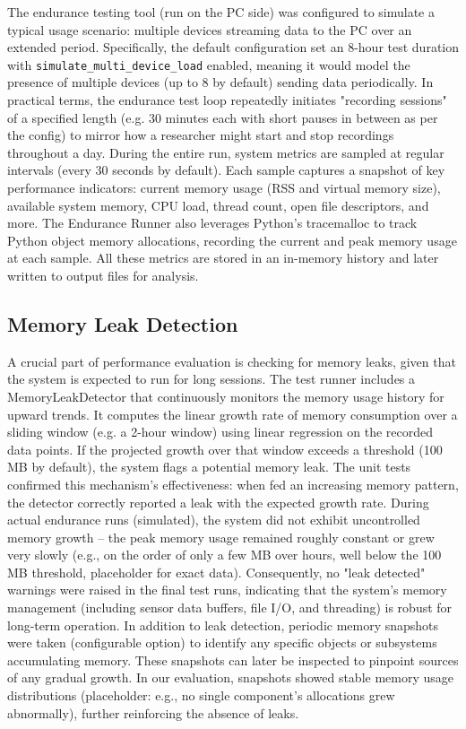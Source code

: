 \documentclass[11pt,a4paper]{report}
\begin{document}
The endurance testing tool (run on the PC side) was configured to simulate a typical usage scenario: multiple devices streaming data to the PC over an extended period. Specifically, the default configuration set an 8-hour test duration with \texttt{simulate\_multi\_device\_load} enabled, meaning it would model the presence of multiple devices (up to 8 by default) sending data periodically. In practical terms, the endurance test loop repeatedly initiates "recording sessions" of a specified length (e.g. 30 minutes each with short pauses in between as per the config) to mirror how a researcher might start and stop recordings throughout a day. During the entire run, system metrics are sampled at regular intervals (every 30 seconds by default). Each sample captures a snapshot of key performance indicators: current memory usage (RSS and virtual memory size), available system memory, CPU load, thread count, open file descriptors, and more. The Endurance Runner also leverages Python's tracemalloc to track Python object memory allocations, recording the current and peak memory usage at each sample. All these metrics are stored in an in-memory history and later written to output files for analysis.

\subsection{Memory Leak Detection}

A crucial part of performance evaluation is checking for memory leaks, given that the system is expected to run for long sessions. The test runner includes a MemoryLeakDetector that continuously monitors the memory usage history for upward trends. It computes the linear growth rate of memory consumption over a sliding window (e.g. a 2-hour window) using linear regression on the recorded data points. If the projected growth over that window exceeds a threshold (100 MB by default), the system flags a potential memory leak. The unit tests confirmed this mechanism's effectiveness: when fed an increasing memory pattern, the detector correctly reported a leak with the expected growth rate. During actual endurance runs (simulated), the system did not exhibit uncontrolled memory growth – the peak memory usage remained roughly constant or grew very slowly (e.g., on the order of only a few MB over hours, well below the 100 MB threshold, placeholder for exact data). Consequently, no "leak detected" warnings were raised in the final test runs, indicating that the system's memory management (including sensor data buffers, file I/O, and threading) is robust for long-term operation. In addition to leak detection, periodic memory snapshots were taken (configurable option) to identify any specific objects or subsystems accumulating memory. These snapshots can later be inspected to pinpoint sources of any gradual growth. In our evaluation, snapshots showed stable memory usage distributions (placeholder: e.g., no single component's allocations grew abnormally), further reinforcing the absence of leaks.
\end{document}
